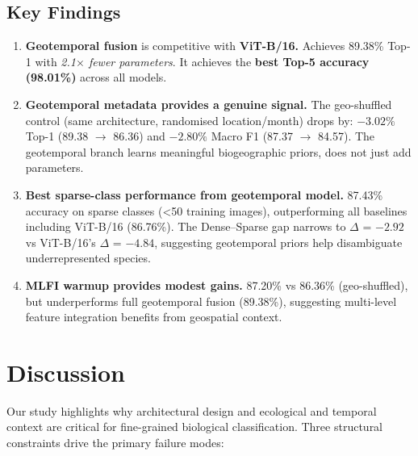\documentclass[runningheads]{llncs}
\begin{document}
\subsection{Key Findings}
\begin{enumerate}
    \item \textbf{Geotemporal fusion} is competitive with \textbf{ViT-B/16.} Achieves 89.38\% Top-1 with \textit{2.1$\times$ fewer parameters}. It achieves the \textbf{best Top-5 accuracy (98.01\%)} across all models.
    \item \textbf{Geotemporal metadata provides a genuine signal.} The geo-shuffled control (same architecture, randomised location/month) drops by: $-3.02\%$ Top-1 (89.38 $\to$ 86.36) and $-2.80\%$ Macro F1 (87.37 $\to$ 84.57). The geotemporal branch learns meaningful biogeographic priors, does not just add parameters.
    \item \textbf{Best sparse-class performance from geotemporal model.} 87.43\% accuracy on sparse classes (<50 training images), outperforming all baselines including ViT-B/16 (86.76\%). The Dense–Sparse gap narrows to $\Delta$ = $-2.92$ vs ViT-B/16's $\Delta$ = $-4.84$, suggesting geotemporal priors help disambiguate underrepresented species.
    \item \textbf{MLFI warmup provides modest gains.} 87.20\% vs 86.36\% (geo-shuffled), but underperforms full geotemporal fusion (89.38\%), suggesting multi-level feature integration benefits from geospatial context.
\end{enumerate}

\section{Discussion}
Our study highlights why architectural design and ecological and temporal context are critical for fine-grained biological classification. Three structural constraints drive the primary failure modes:
\end{document}
